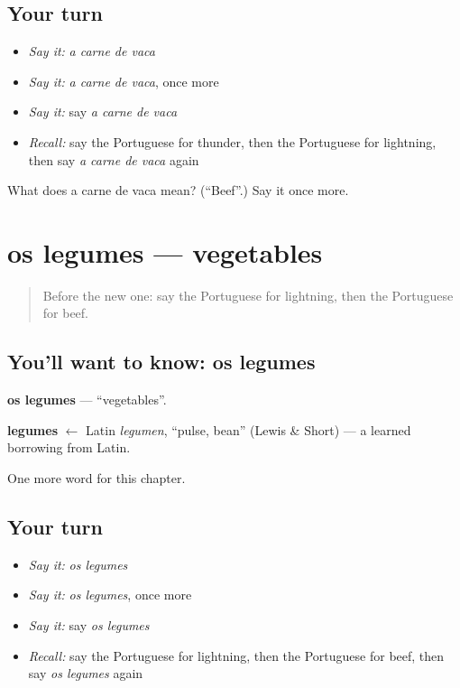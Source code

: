 \subsection*{Your turn}
\begin{itemize}
\raggedright
  \item \emph{Say it:} \emph{a carne de vaca}
  \item \emph{Say it:} \emph{a carne de vaca}, once more
  \item \emph{Say it:} say \emph{a carne de vaca}
  \item \emph{Recall:} say the Portuguese for thunder, then the Portuguese for lightning, then say \emph{a carne de vaca} again
\end{itemize}

\begin{tcolorbox}[breakable,colback=teal!4,colframe=teal!35!black,title={Before you move on}]
What does a carne de vaca mean? (\textquotedblleft{}Beef\textquotedblright{}.) Say it once more.
\end{tcolorbox}
\section[os legumes]{os legumes — vegetables}

\label{lesson:PT-C105-legumes}



\begin{quote}
Before the new one: say the Portuguese for lightning, then the Portuguese for beef.
\end{quote}

\subsection*{You'll want to know: os legumes}
\textbf{os legumes} — \textquotedblleft{}vegetables\textquotedblright{}.

\begin{cousinweb}
\textbf{legumes} $\leftarrow$ Latin \emph{legumen}, \textquotedblleft{}pulse, bean\textquotedblright{} (Lewis \& Short) — a learned borrowing from Latin.
\end{cousinweb}

\begin{grammarlens}[title={What you've built}]
One more word for this chapter.
\end{grammarlens}

\subsection*{Your turn}
\begin{itemize}
\raggedright
  \item \emph{Say it:} \emph{os legumes}
  \item \emph{Say it:} \emph{os legumes}, once more
  \item \emph{Say it:} say \emph{os legumes}
  \item \emph{Recall:} say the Portuguese for lightning, then the Portuguese for beef, then say \emph{os legumes} again
\end{itemize}

